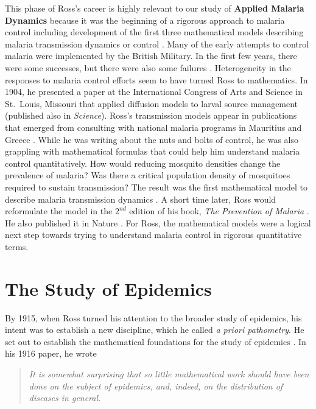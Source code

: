 \documentclass[
]{book}
\begin{document}
This phase of Ross's career is highly relevant to our study of \textbf{Applied Malaria Dynamics} because it was the beginning of a rigorous approach to malaria control including development of the first three mathematical models describing malaria transmission dynamics or control \autocite{RossR1905LogicalBasis,RossR1908,RossR1911Book,RossR1911Nature}.
Many of the early attempts to control malaria were implemented by the British Military. In the first few years, there were some successes, but there were also some failures \autocite{RossR1907PreventionMalaria}.
Heterogeneity in the responses to malaria control efforts seem to have turned Ross to mathematics.
In 1904, he presented a paper at the International Congress of Arts and Science in St.~Louis, Missouri that applied diffusion models to larval source management (published also in \emph{Science}\autocite{RossR1905LogicalBasis}).
Ross's transmission models appear in publications that emerged from consulting with national malaria programs in Mauritius and Greece \autocite{RossR1908,RossR1909}.
While he was writing about the nuts and bolts of control, he was also grappling with mathematical formulas that could help him understand malaria control quantitatively.
How would reducing mosquito densities change the prevalence of malaria?
Was there a critical population density of mosquitoes required to sustain transmission?
The result was the first mathematical model to describe malaria transmission dynamics \autocite{RossR1908}.
A short time later, Ross would reformulate the model in the \(2^{nd}\) edition of his book, \emph{The Prevention of Malaria} \autocite{RossR1911Book}.
He also published it in Nature \autocite{RossR1911Nature}. For Ross, the mathematical models were a logical next step towards trying to understand malaria control in rigorous quantitative terms.

\section{The Study of Epidemics}\label{the-study-of-epidemics}

By 1915, when Ross turned his attention to the broader study of epidemics, his intent was to establish a new discipline, which he called \emph{a priori pathometry}.
He set out to establish the mathematical foundations for the study of epidemics \autocite{RossR1915AprioriPathometry,RossR1916ApplicationTheory}.
In his 1916 paper, he wrote

\begin{quote}
\emph{It is somewhat surprising that so little mathematical work should have been done on the subject of epidemics, and, indeed, on the distribution of diseases in general.}
\end{quote}
\end{document}
